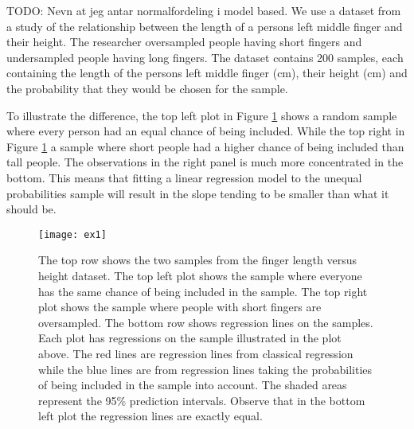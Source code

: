 \documentclass{article}
\begin{document}
\begin{example}

  TODO: Nevn at jeg antar normalfordeling i model based.
We use a dataset from a study of the relationship between the length of a persons left middle finger and their height. 
The researcher oversampled people having short fingers and undersampled people
having long fingers.
The dataset contains 200 samples, each containing the length of the persons left middle finger (cm), their height (cm) and the probability that they would be chosen for the sample.

To illustrate the difference, the top left plot in Figure \ref{fig:ex1} shows a random sample where every
person had an equal chance of being included. While the top right in Figure \ref{fig:ex1} a sample
where short people had a higher chance of being included than tall people. The
observations in the right panel is much more concentrated in the bottom.
This means that fitting a linear regression model to the unequal probabilities
sample will result in the slope tending to be smaller than what it should be.

\begin{figure}
  \centering
  
  \texttt{[image: ex1]}

  \caption{The top row shows the two samples from the finger length versus
    height dataset. The top left plot shows the sample where everyone has the
    same chance of being included in the sample.
    The top right plot shows the sample where people with short fingers are
    oversampled. The bottom row shows regression lines on the samples. Each plot has
    regressions on the sample illustrated in the plot above. The red lines are
    regression lines from classical regression while the blue lines are from
    regression lines taking the probabilities of being included in the sample
    into account. The shaded areas represent the 95\% prediction intervals.
    Observe that in the bottom left plot the regression lines are exactly equal.}

  \label{fig:ex1}



\end{figure}
\end{example}
\end{document}
